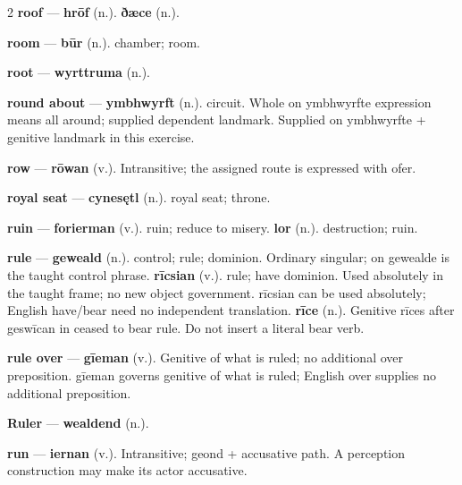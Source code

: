 \begin{multicols}{2}
\textbf{roof} — \textbf{hrōf} (n.).  \textbf{ðæce} (n.).\par
\textbf{room} — \textbf{būr} (n.). chamber; room.\par
\textbf{root} — \textbf{wyrttruma} (n.).\par
\textbf{round about} — \textbf{ymbhwyrft} (n.). circuit. Whole on ymbhwyrfte expression means all around; supplied dependent landmark. Supplied on ymbhwyrfte + genitive landmark in this exercise.\par
\textbf{row} — \textbf{rōwan} (v.). Intransitive; the assigned route is expressed with ofer.\par
\textbf{royal seat} — \textbf{cynesętl} (n.). royal seat; throne.\par
\textbf{ruin} — \textbf{forierman} (v.). ruin; reduce to misery. \textbf{lor} (n.). destruction; ruin.\par
\textbf{rule} — \textbf{geweald} (n.). control; rule; dominion. Ordinary singular; on gewealde is the taught control phrase. \textbf{rīcsian} (v.). rule; have dominion. Used absolutely in the taught frame; no new object government. rīcsian can be used absolutely; English have/bear need no independent translation. \textbf{rīce} (n.). Genitive rīces after geswīcan in ceased to bear rule. Do not insert a literal bear verb.\par
\textbf{rule over} — \textbf{gīeman} (v.). Genitive of what is ruled; no additional over preposition. gīeman governs genitive of what is ruled; English over supplies no additional preposition.\par
\textbf{Ruler} — \textbf{wealdend} (n.).\par
\textbf{run} — \textbf{iernan} (v.). Intransitive; geond + accusative path. A perception construction may make its actor accusative.\par

\end{multicols}
